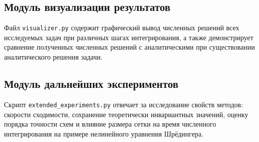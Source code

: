 \subsection{Модуль визуализации результатов}
Файл \texttt{visualizer.py} содержит графический вывод численных решений всех исследуемых задач при различных шагах интегрирования, а также демонстрирует сравнение полученных численных решений с аналитическими при существовании аналитического решения задачи.

\subsection{Модуль дальнейших экспериментов}
Скрипт \texttt{extended\_experiments.py} отвечает за исследование свойств методов: скорости сходимости, сохранение теоретически инвариантных значений, оценку порядка точности схем и влияние размера сетки на время численного интегрирования на примере нелинейного уравнения Шрёдингера.